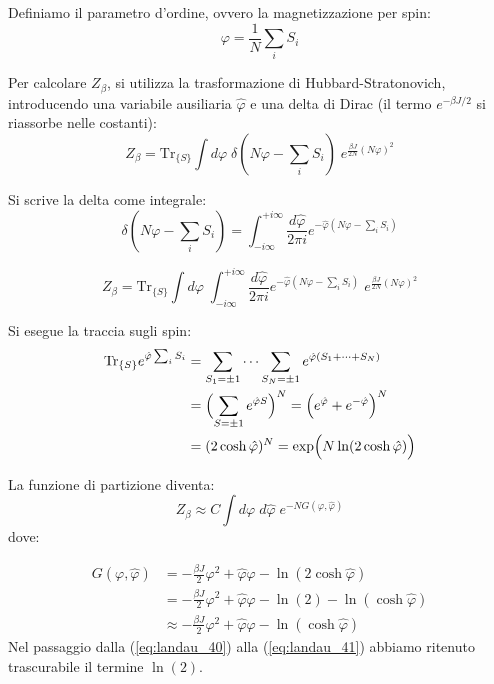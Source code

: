 Definiamo il parametro d'ordine, ovvero la magnetizzazione per spin:
\begin{equation} 
\varphi = \frac{1}{N}\sum_{i}S_{i} 
\end{equation}

Per calcolare $Z_\beta$, si utilizza la trasformazione di Hubbard-Stratonovich, introducendo una variabile ausiliaria $\hat{\varphi}$ e una delta di Dirac (il termo $e^{-\beta J/2}$ si riassorbe nelle costanti):
\begin{equation}
Z_{\beta} = \text{Tr}_{\{S\}} \int d \varphi \; \delta\left(N\varphi-\sum_{i} S_{i}\right) \; e^{\frac{\beta J}{2N}(N \varphi)^{2}}
\end{equation}

Si scrive la delta come integrale:
\begin{equation} 
\delta\left(N\varphi-\sum_{i} S_{i}\right)=\int_{-i\infty}^{+i\infty}\frac{d\hat{\varphi}}{2\pi i}e^{-\hat{\varphi}(N\varphi-\sum_{i}S_i)} 
\end{equation}

\begin{equation}
Z_{\beta} = \text{Tr}_{\{S\}} \int d \varphi \; \int_{-i\infty}^{+i\infty}\frac{d\hat{\varphi}}{2\pi i}e^{-\hat{\varphi}(N\varphi-\sum_{i}S_i)} \; e^{\frac{\beta J}{2N}(N \varphi)^{2}}
\end{equation}

Si esegue la traccia sugli spin:
\begin{align} 
\text{Tr}_{\{S\}}e^{\hat{\varphi}\sum_{i} S_i} &= \sum_{S_1=\pm1} \dots \sum_{S_N=\pm1} e^{\hat{\varphi}(S_1 + \dots + S_N)} \nonumber \\ 
&= \Bigl( \sum_{S=\pm1} e^{\hat{\varphi} S} \Bigr)^N = \Bigl( e^{\hat{\varphi}} + e^{-\hat{\varphi}} \Bigr)^N \nonumber \\
&=(2\cosh\hat{\varphi})^{N} = \exp \Bigl(N \ln(2 \cosh\hat{\varphi}) \Bigr)
\end{align}

La funzione di partizione diventa:
\begin{equation}
Z_{\beta} \approx C \int d\varphi \; d\hat{\varphi} \; e^{-NG(\varphi,\hat{\varphi})}
\label{eq:landau_40}
\end{equation}
dove:

\begin{align}
G(\varphi,\hat{\varphi}) &= -\frac{\beta J}{2}\varphi^{2}+\hat{\varphi}\varphi-\ln(2\cosh\hat{\varphi}) \nonumber \\ 
&= -\frac{\beta J}{2}\varphi^{2}+\hat{\varphi}\varphi-\ln(2) -\ln(\cosh\hat{\varphi}) \nonumber \\ 
&\approx -\frac{\beta J}{2}\varphi^{2}+\hat{\varphi}\varphi -\ln(\cosh\hat{\varphi})
\label{eq:landau_41}
\end{align}
Nel passaggio dalla (\ref{eq:landau_40}) alla (\ref{eq:landau_41}) abbiamo ritenuto trascurabile il termine $\ln(2)$.

